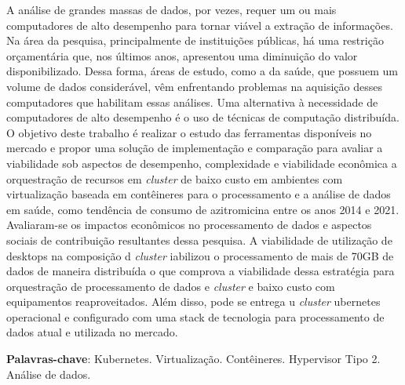 
\begin{resumo}
    A análise de grandes massas de dados, por vezes, requer um ou mais computadores de alto desempenho para tornar viável a extração de informações. Na área da pesquisa, principalmente de instituições públicas, há uma restrição orçamentária que, nos últimos anos, apresentou uma diminuição do valor disponibilizado. Dessa forma, áreas de estudo, como a da saúde, que possuem um volume de dados considerável, vêm enfrentando problemas na aquisição desses computadores que habilitam essas análises. Uma alternativa à necessidade de computadores de alto desempenho é o uso de técnicas de computação distribuída. O objetivo deste trabalho é realizar o estudo das ferramentas disponíveis no mercado e propor uma solução de implementação e comparação para avaliar a viabilidade sob aspectos de desempenho, complexidade e viabilidade econômica a orquestração de recursos em \emph{cluster} de baixo custo em ambientes com virtualização baseada em contêineres para o processamento e a análise de dados em saúde, como tendência de consumo de azitromicina entre os anos 2014 e 2021. Avaliaram-se os impactos econômicos no processamento de dados e aspectos sociais de contribuição resultantes dessa pesquisa. A viabilidade de utilização de desktops na composição d \emph{cluster} iabilizou o processamento de mais de 70GB de dados de maneira distribuída o que comprova a viabilidade dessa estratégia para orquestração de processamento de dados e \emph{cluster} e baixo custo com equipamentos reaproveitados. Além disso, pode se entrega u \emph{cluster} ubernetes operacional e configurado com uma stack de tecnologia para processamento de dados  atual e utilizada no mercado.

    \textbf{Palavras-chave}: Kubernetes\textregistered. Virtualização. Contêineres. Hypervisor Tipo 2. Análise de dados.
\end{resumo}


